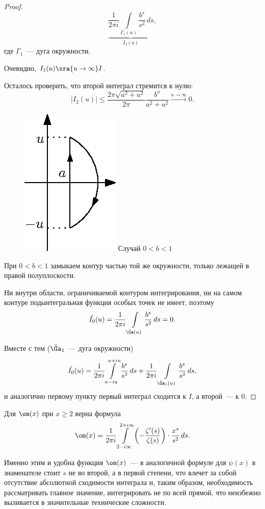 \begin{proof}
$$\underbrace{\frac{1}{2\pi i}\int\limits_{\Gamma_1(u)}\frac{b^s}{s^2}\,ds}_{I_2(u)},$$
где $\Gamma_1$~— дуга окружности.\par
Очевидно, $I_1(u)\xra{u\to\infty}I$.\par
Осталось проверить, что второй интеграл стремится к нулю:
$$|I_2(u)| \leqslant \frac{2\pi\sqrt{a^2 + u^2}}{2\pi}\frac{b^a}{a^2 + u^2}\xrightarrow{u \to \infty} 0.$$\par
\begin{figure}
\begin{center}
\vskip -30pt
\includegraphics[scale=1.0]{pics/05013}
Случай $0 < b < 1$
\end{center}
\end{figure}
 При $0 < b <1$ замыкаем контур частью той же окружности, только лежащей в правой полуплоскости.\par
Ни внутри области, ограничиваемой контуром интегрирования, ни на самом контуре подынтегральная функция особых точек не имеет, поэтому
$$\hat{I_0}(u) = \frac{1}{2\pi i}\int\limits_{\hat{\Ga}(u)} \frac{b^s}{s^2}\,ds = 0.$$\par
Вместе с тем ($\hat{\Ga}_1$~— дуга окружности) $$\hat{I_0}(u)=\frac{1}{2\pi i}\int\limits_{a - iu}^{a + iu}\frac{b^s}{s^2}\,ds+
\frac{1}{2\pi i}\int\limits_{\hat{\Ga}_1(u)}\frac{b^s}{s^2}\,ds,$$
и аналогично первому пункту первый интеграл сходится к $I$, а второй~— к $0$.
\end{proof}
\begin{stm}
Для $\om(x)$ при $x\ge2$ верна формула
$$\om(x)=\frac{1}{2\pi i}\int\limits_{2 - i\infty}^{2 + i\infty}\left(-\frac{\zeta '(s)}{\zeta(s)}\right) \cdot \frac{x^s}{s^2}\,ds.$$
\end{stm}
\begin{note}
Именно этим и удобна функция $\om(x)$~— в аналогичной формуле для $\psi(x)$ в знаменателе стоит $s$ не во второй, а в первой степени, что влечет за собой отсутствие абсолютной сходимости интеграла и, таким образом, необходимость рассматривать главное значение, интегрировать не по всей прямой, что неизбежно выливается в значительные технические сложности.
\end{note}
